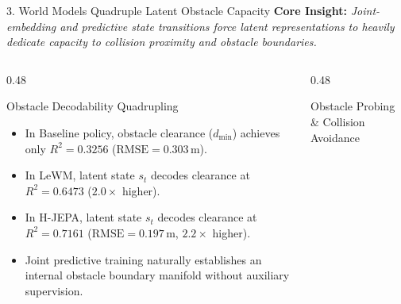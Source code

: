 \documentclass[aspectratio=169, 10pt]{beamer}
\begin{document}
\begin{frame}{3. World Models Quadruple Latent Obstacle Capacity}
  \textbf{Core Insight:} \textit{Joint-embedding and predictive state transitions force latent representations to heavily dedicate capacity to collision proximity and obstacle boundaries.}

  \vspace{0.2cm}
  \begin{columns}[T]
    \begin{column}{0.48\textwidth}
      \begin{block}{Obstacle Decodability Quadrupling}
        \small
        \begin{itemize}
          \item In Baseline policy, obstacle clearance ($d_{\mathrm{min}}$) achieves only $R^2 = 0.3256$ ($\mathrm{RMSE} = 0.303\,\mathrm{m}$).
          \item In LeWM, latent state $s_t$ decodes clearance at $R^2 = 0.6473$ ($2.0\times$ higher).
          \item In H-JEPA, latent state $s_t$ decodes clearance at $R^2 = \mathbf{0.7161}$ ($\mathrm{RMSE} = 0.197\,\mathrm{m}$, $2.2\times$ higher).
          \item Joint predictive training naturally establishes an internal obstacle boundary manifold without auxiliary supervision.
        \end{itemize}
      \end{block}
    \end{column}

    \begin{column}{0.48\textwidth}
      \begin{block}{Obstacle Probing \& Collision Avoidance}
        \centering
\end{block}
\end{column}
\end{columns}
\end{frame}
\end{document}
